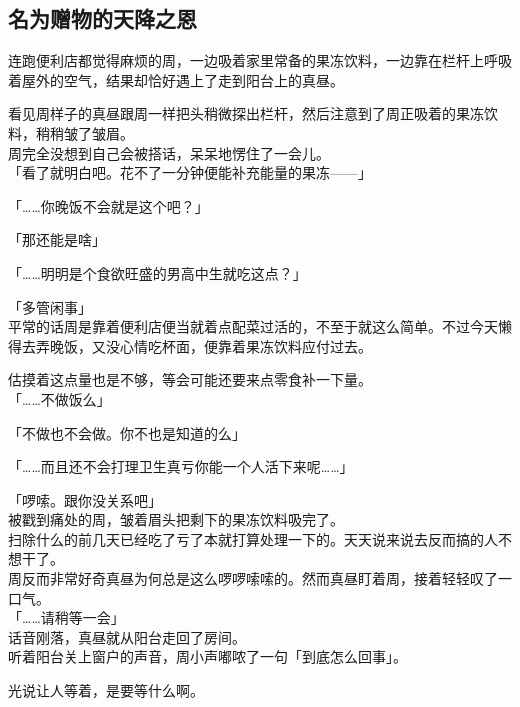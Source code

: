 \subsection{名为赠物的天降之恩}

连跑便利店都觉得麻烦的周，一边吸着家里常备的果冻饮料，一边靠在栏杆上呼吸着屋外的空气，结果却恰好遇上了走到阳台上的真昼。

看见周样子的真昼跟周一样把头稍微探出栏杆，然后注意到了周正吸着的果冻饮料，稍稍皱了皱眉。\\

周完全没想到自己会被搭话，呆呆地愣住了一会儿。\\

「看了就明白吧。花不了一分钟便能补充能量的果冻——」

「……你晚饭不会就是这个吧？」

「那还能是啥」

「……明明是个食欲旺盛的男高中生就吃这点？」

「多管闲事」\\

平常的话周是靠着便利店便当就着点配菜过活的，不至于就这么简单。不过今天懒得去弄晚饭，又没心情吃杯面，便靠着果冻饮料应付过去。

估摸着这点量也是不够，等会可能还要来点零食补一下量。\\

「……不做饭么」

「不做也不会做。你不也是知道的么」

「……而且还不会打理卫生真亏你能一个人活下来呢……」

「啰嗦。跟你没关系吧」\\

被戳到痛处的周，皱着眉头把剩下的果冻饮料吸完了。\\

扫除什么的前几天已经吃了亏了本就打算处理一下的。天天说来说去反而搞的人不想干了。\\

周反而非常好奇真昼为何总是这么啰啰嗦嗦的。然而真昼盯着周，接着轻轻叹了一口气。\\

「……请稍等一会」\\

话音刚落，真昼就从阳台走回了房间。\\

听着阳台关上窗户的声音，周小声嘟哝了一句「到底怎么回事」。

光说让人等着，是要等什么啊。\\

